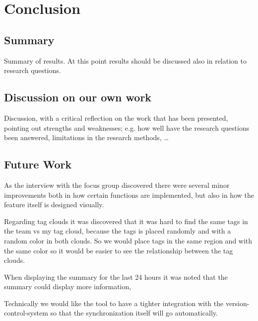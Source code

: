 \chapter{Conclusion}

\section{Summary}
Summary of results. At this point results should be discussed also in
relation to research questions.

\section{Discussion on our own work}
Discussion, with a critical reflection on the work that has been presented,
pointing out strengths and weaknesses; e.g. how well have the research questions been answered, limitations in the research methods, …

\section{Future Work}
As the interview with the focus group discovered there were several minor improvements both in how certain functions are implemented, but also in how the feature itself is designed visually. 

Regarding tag clouds it was discovered that it was hard to find the same tags in the team vs my tag cloud, because the tags is placed randomly and with a random color in both clouds. So we would place tags in the same region and with the same color so it would be  easier to see the relationship between the tag clouds.

When displaying the summary for the last 24 hours it was noted that the summary could display more information,

Technically we would like the tool to have a tighter integration with the version-control-system so that the synchronization itself will go automatically.